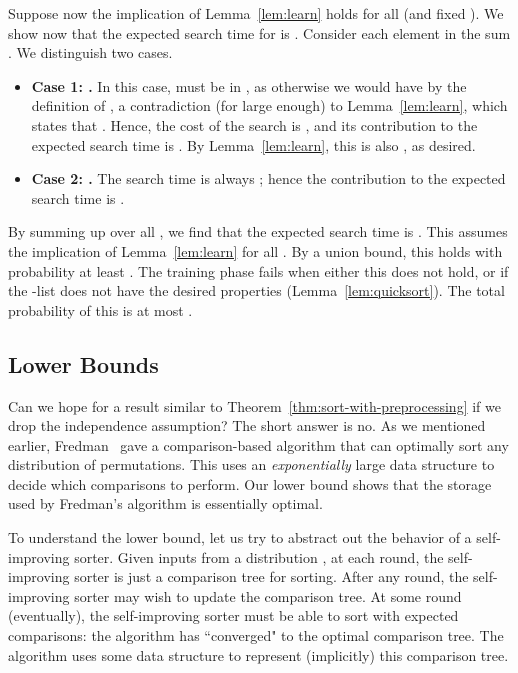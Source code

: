 \documentclass{siamltex}
\begin{document}
Suppose now the implication of Lemma~\ref{lem:learn} holds for all  
(and fixed ).
We show now that the expected search time for  is 
.
Consider each element in the sum .
We distinguish two cases.

\begin{itemize}
\item \textbf{Case 1: .} 
In this case,  must be in ,
as otherwise we would have 
by the definition of , a contradiction (for  large enough)
to Lemma~\ref{lem:learn},
which states that  .
Hence,
the cost of the search is , and its
contribution to the expected search time is 
. By Lemma~\ref{lem:learn},
this is also , as desired.

\item
\textbf{Case 2: .} The search time is always 
; hence the contribution to 
the expected search time is .
\end{itemize}

By summing up over all , we find that 
the expected search time is .
This assumes the implication of Lemma~\ref{lem:learn} for all .
By a union bound, this holds with probability at least .
The training phase fails when either this does not hold,
or if the -list does not have the desired properties 
(Lemma~\ref{lem:quicksort}).
The total probability of this is at most .


\subsection{Lower Bounds} \label{sec:lb}

Can we hope for a result similar to Theorem~\ref{thm:sort-with-preprocessing}
if we drop the independence assumption? The short answer is no.
As we mentioned earlier, Fredman~\cite{Fredman76} gave a 
comparison-based algorithm that can optimally
sort any distribution of permutations. This uses 
an \emph{exponentially} large data
structure to decide which comparisons to perform. Our 
lower bound shows that the
storage used by Fredman's algorithm is essentially optimal.

To understand the lower bound, let us try to abstract out the behavior
of a self-improving sorter. Given inputs from a distribution , at each
round, the self-improving sorter is just a comparison tree for sorting.
After any round, the self-improving sorter may wish to update the 
comparison tree.
At some round (eventually), the self-improving sorter must
be able to sort with expected  comparisons: 
the algorithm has ``converged" to the optimal comparison tree.
The algorithm uses some data structure to represent
(implicitly) this comparison tree.
\end{document}
